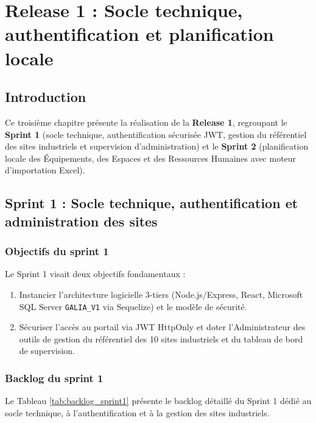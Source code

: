 \chapter{Release 1 : Socle technique, authentification et planification locale}
\label{chap:release1}


\section*{Introduction}

Ce troisième chapitre présente la réalisation de la \textbf{Release 1}, regroupant le \textbf{Sprint 1} (socle technique, authentification sécurisée JWT, gestion du référentiel des sites industriels et supervision d'administration) et le \textbf{Sprint 2} (planification locale des Équipements, des Espaces et des Ressources Humaines avec moteur d'importation Excel).

\section{Sprint 1 : Socle technique, authentification et administration des sites}

\subsection{Objectifs du sprint 1}
Le Sprint 1 visait deux objectifs fondamentaux :
\begin{enumerate}
    \item Instancier l'architecture logicielle 3-tiers (Node.js/Express, React, Microsoft SQL Server \texttt{GALIA\_V1} via Sequelize) et le modèle de sécurité.
    \item Sécuriser l'accès au portail via JWT HttpOnly et doter l'Administrateur des outils de gestion du référentiel des 10 sites industriels et du tableau de bord de supervision.
\end{enumerate}

\subsection{Backlog du sprint 1}
Le Tableau \ref{tab:backlog_sprint1} présente le backlog détaillé du Sprint 1 dédié au socle technique, à l'authentification et à la gestion des sites industriels.

